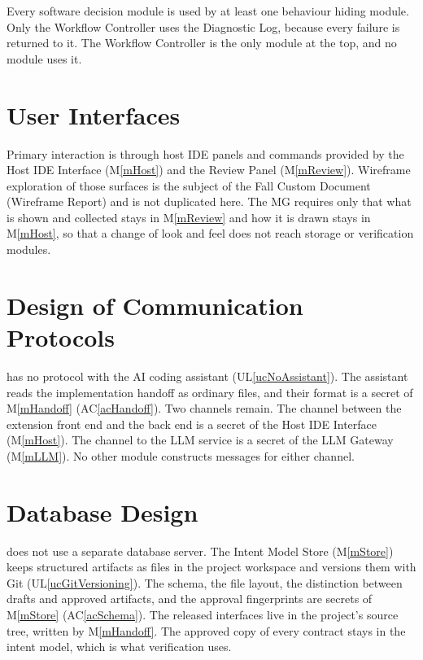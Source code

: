 \documentclass[12pt, titlepage]{article}
\newcommand{\acref}[1]{AC\ref{#1}}
\newcommand{\uref}[1]{UL\ref{#1}}
\newcommand{\mref}[1]{M\ref{#1}}
\begin{document}
Every software decision module is used by at least one behaviour hiding module.
Only the Workflow Controller uses the Diagnostic Log, because every failure is
returned to it.
The Workflow Controller is the only module at the top, and no module uses it.

\section{User Interfaces}

Primary interaction is through host IDE panels and commands provided by the
Host IDE Interface (\mref{mHost}) and the Review Panel (\mref{mReview}).
Wireframe exploration of those surfaces is the subject of the Fall Custom
Document (Wireframe Report) and is not duplicated here. The MG requires only
that what is shown and collected stays in \mref{mReview} and how it is drawn
stays in \mref{mHost}, so that a change of look and feel does not reach storage
or verification modules.

\section{Design of Communication Protocols}

\progname{} has no protocol with the AI coding assistant (\uref{ucNoAssistant}).
The assistant reads the implementation handoff as ordinary files, and their
format is a secret of \mref{mHandoff} (\acref{acHandoff}). Two channels
remain. The channel between the extension front end and the back end is a
secret of the Host IDE Interface (\mref{mHost}). The channel to the LLM service
is a secret of the LLM Gateway (\mref{mLLM}). No other module constructs
messages for either channel.

\section{Database Design}

\progname{} does not use a separate database server. The Intent Model Store
(\mref{mStore}) keeps structured artifacts as files in the project workspace
and versions them with Git (\uref{ucGitVersioning}). The schema, the file
layout, the distinction between drafts and approved artifacts, and the
approval fingerprints are secrets of \mref{mStore} (\acref{acSchema}). The
released interfaces live in the project's source tree, written by
\mref{mHandoff}. The approved copy of every contract stays in the intent
model, which is what verification uses.
\end{document}
